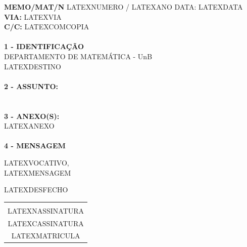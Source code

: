 \documentclass[12pt]{artigo_novo}
\begin{document}
\vspace*{.8cm}
\timbrado
\setlength{\baselineskip}{5mm}
\noindent 
\begin{minipage}{16cm}
\vspace*{-8mm}
\parindent=1.2cm
\setlength{\baselineskip}{5mm}
\vspace*{.2cm}
\noindent
\small
{\bf  MEMO/MAT/N\primo} LATEXNUMERO / LATEXANO \hfill {DATA:} {LATEXDATA}
\vum \\
{\bf VIA:} {LATEXVIA}  
\\
{\bf C/C:} {LATEXCOMCOPIA}  
\\
\mbox{} \hrulefill\
\\
{\bf 1 - IDENTIFICA\c{C}\~AO} 
\\
\phantom{xxx}{\bf Proced\^encia:} {DEPARTAMENTO DE MATEM\'ATICA - UnB}
\\
 {LATEXDESTINO}
\\
\mbox{} \hrulefill\
\\
{\bf 2 - ASSUNTO:} \\
\phantom{xxx}{LATEXASSUNTO}
\\
\mbox{} \hrulefill\
\\
{\bf 3 - ANEXO(S):} 
\\
\phantom{xxx} {LATEXANEXO}
\\
\mbox{} \hrulefill\
\\
{ \bf 4 - MENSAGEM} 
\end{minipage}
\setlength{\baselineskip}{5mm}
\vspace*{.92cm} 

LATEXVOCATIVO,
\vspace*{8mm} \\
\noindent 
LATEXMENSAGEM 
\vspace*{8mm} 
\hspace*{8cm} 
\setlength{\baselineskip}{5mm}
\vspace*{10mm} 

LATEXDESFECHO
\vspace*{15mm} \\
\begin{center} 
\begin{tabular}{c}
\hline \vspace*{-3mm}\\
LATEXNASSINATURA \\
{\small LATEXCASSINATURA}\\
{\small LATEXMATRICULA}
%
\end{tabular} 
\end{center}
\end{document}
